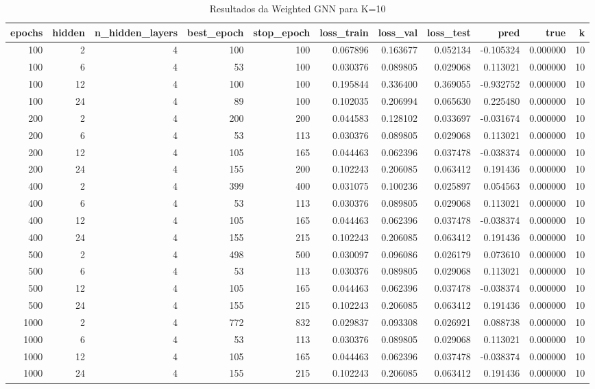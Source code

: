 \begin{table}
\caption{Resultados da Weighted GNN para K=10}
\label{tab:weighted_gnn_results_k10}
\begin{tabular}{rrrrrrrrrrr}
\toprule
epochs & hidden & n\_hidden\_layers & best\_epoch & stop\_epoch & loss\_train & loss\_val & loss\_test & pred & true & k \\
\midrule
100 & 2 & 4 & 100 & 100 & 0.067896 & 0.163677 & 0.052134 & -0.105324 & 0.000000 & 10 \\
100 & 6 & 4 & 53 & 100 & 0.030376 & 0.089805 & 0.029068 & 0.113021 & 0.000000 & 10 \\
100 & 12 & 4 & 100 & 100 & 0.195844 & 0.336400 & 0.369055 & -0.932752 & 0.000000 & 10 \\
100 & 24 & 4 & 89 & 100 & 0.102035 & 0.206994 & 0.065630 & 0.225480 & 0.000000 & 10 \\
200 & 2 & 4 & 200 & 200 & 0.044583 & 0.128102 & 0.033697 & -0.031674 & 0.000000 & 10 \\
200 & 6 & 4 & 53 & 113 & 0.030376 & 0.089805 & 0.029068 & 0.113021 & 0.000000 & 10 \\
200 & 12 & 4 & 105 & 165 & 0.044463 & 0.062396 & 0.037478 & -0.038374 & 0.000000 & 10 \\
200 & 24 & 4 & 155 & 200 & 0.102243 & 0.206085 & 0.063412 & 0.191436 & 0.000000 & 10 \\
400 & 2 & 4 & 399 & 400 & 0.031075 & 0.100236 & 0.025897 & 0.054563 & 0.000000 & 10 \\
400 & 6 & 4 & 53 & 113 & 0.030376 & 0.089805 & 0.029068 & 0.113021 & 0.000000 & 10 \\
400 & 12 & 4 & 105 & 165 & 0.044463 & 0.062396 & 0.037478 & -0.038374 & 0.000000 & 10 \\
400 & 24 & 4 & 155 & 215 & 0.102243 & 0.206085 & 0.063412 & 0.191436 & 0.000000 & 10 \\
500 & 2 & 4 & 498 & 500 & 0.030097 & 0.096086 & 0.026179 & 0.073610 & 0.000000 & 10 \\
500 & 6 & 4 & 53 & 113 & 0.030376 & 0.089805 & 0.029068 & 0.113021 & 0.000000 & 10 \\
500 & 12 & 4 & 105 & 165 & 0.044463 & 0.062396 & 0.037478 & -0.038374 & 0.000000 & 10 \\
500 & 24 & 4 & 155 & 215 & 0.102243 & 0.206085 & 0.063412 & 0.191436 & 0.000000 & 10 \\
1000 & 2 & 4 & 772 & 832 & 0.029837 & 0.093308 & 0.026921 & 0.088738 & 0.000000 & 10 \\
1000 & 6 & 4 & 53 & 113 & 0.030376 & 0.089805 & 0.029068 & 0.113021 & 0.000000 & 10 \\
1000 & 12 & 4 & 105 & 165 & 0.044463 & 0.062396 & 0.037478 & -0.038374 & 0.000000 & 10 \\
1000 & 24 & 4 & 155 & 215 & 0.102243 & 0.206085 & 0.063412 & 0.191436 & 0.000000 & 10 \\
\bottomrule
\end{tabular}
\end{table}

